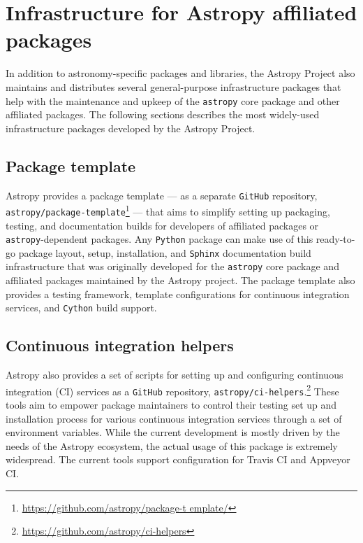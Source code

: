 \documentclass[modern]{aastex61}
\newcommand{\package}[1]{\texttt{#1}\xspace}
\newcommand{\github}{\package{GitHub}}
\newcommand{\python}{\package{Python}}
\newcommand{\astropy}{Astropy\xspace}
\newcommand{\astropypkg}{\package{astropy}}
\newcommand{\inlinecomment}[2]{\todo[inline]{#1: #2}\xspace}
\begin{document}
\section{Infrastructure for Astropy affiliated packages}

\label{sec:infrastructure}

In addition to astronomy-specific packages and libraries, the \astropy Project
also maintains and distributes several general-purpose infrastructure packages
that help with the maintenance and upkeep of the \astropypkg core package and
other affiliated packages.
The following sections describes the most widely-used infrastructure packages
developed by the \astropy Project.

\subsection{Package template}

\astropy provides a package template --- as a separate \github repository,
\package{astropy/package-template}\footnote{\url{https://github.com/astropy/package-t
emplate/}} --- that aims to simplify setting up packaging, testing, and
documentation builds for developers of affiliated packages or
\astropypkg-dependent packages.
Any \python package can make use of this ready-to-go package layout, setup,
installation, and \package{Sphinx} documentation build infrastructure that was
originally developed for the \astropypkg core package and affiliated packages
maintained by the \astropy project.
The package template also provides a testing framework, template configurations
for continuous integration services, and \package{Cython} build support.

\subsection{Continuous integration helpers}

\astropy also provides a set of scripts for setting up and configuring
continuous integration (CI) services as a \github repository,
\package{astropy/ci-helpers}.\footnote{\url{https://github.com/astropy/ci-helpers}}
These tools aim to empower package maintainers to control their testing set up
and installation process for various continuous integration services through a
set of environment variables.
While the current development is mostly driven by the needs of the \astropy
ecosystem, the actual usage of this package is extremely widespread. The current
tools support configuration for Travis CI and Appveyor CI.
\end{document}
